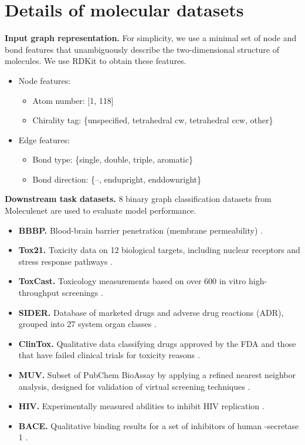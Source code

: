 \documentclass{article} \usepackage{iclr2020_conference,times}
\numberwithin{equation}{section}
\theoremstyle{plain}
\theoremstyle{definition}
\theoremstyle{remark}
\begin{document}
\section{Details of molecular datasets} \label{app:molecule-feat}



{\bf Input graph representation.} For simplicity, we use a minimal set of node and bond features that unambiguously describe the two-dimensional structure of molecules. We use RDKit \citep{landrum2006rdkit} to obtain these features.
\begin{itemize}
  \setlength{\parskip}{0cm}
  \setlength{\itemsep}{0cm}
\item Node features: 
\begin{itemize}
  \setlength{\parskip}{0cm}
  \setlength{\itemsep}{0cm}
\item Atom number: [1, 118]
\item Chirality tag: \{unspecified, tetrahedral cw, tetrahedral ccw, other\}
\end{itemize}
\item Edge features:
\begin{itemize}
  \setlength{\parskip}{0cm}
  \setlength{\itemsep}{0cm}
\item Bond type: \{single, double, triple, aromatic\}
\item Bond direction: \{--, endupright, enddownright\}
\end{itemize}
\end{itemize}



\label{app:moleculenet}
{\bf Downstream task datasets.} 8 binary graph classification datasets from Moleculenet \citep{wu2018moleculenet} are used to evaluate model performance. 

\begin{itemize}
\item {\bf BBBP.} Blood-brain barrier penetration (membrane permeability) \citep{martins2012bayesian}.
\item {\bf Tox21.} Toxicity data on 12 biological targets, including nuclear receptors and stress response pathways \citep{TOX21}.
\item {\bf ToxCast.} Toxicology measurements based on over 600 in vitro high-throughput screenings \citep{richard2014toxcast}.
\item {\bf SIDER.} Database of marketed drugs and adverse drug reactions (ADR), grouped into 27 system organ classes \citep{kuhn2015sider}.
\item {\bf ClinTox.} Qualitative data classifying drugs approved by the FDA and those that have failed clinical trials for toxicity reasons \citep{novick2013sweetlead, AACT}.
\item {\bf MUV.} Subset of PubChem BioAssay by applying a refined nearest neighbor analysis, designed for validation of virtual screening techniques \citep{gardiner2011effectiveness}.
\item {\bf HIV.} Experimentally measured abilities to inhibit HIV replication \citep{HIV}.
\item {\bf BACE.} Qualitative binding results for a set of inhibitors of human -secretase 1 \citep{subramanian2016computational}.
\end{itemize}
\end{document}
